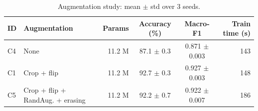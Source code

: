 \begin{table}[t]
\caption{Augmentation study: mean $\pm$ std over 3 seeds.}
\label{tab:augmentation}
\begin{tabular}{llrccr}
\toprule
ID & Augmentation & Params & Accuracy (\%) & Macro-F1 & Train time (s) \\
\midrule
C4 & None & 11.2 M & 87.1 $\pm$ 0.3 & 0.871 $\pm$ 0.003 & 143 \\
C1 & Crop + flip & 11.2 M & 92.7 $\pm$ 0.3 & 0.927 $\pm$ 0.003 & 148 \\
C5 & Crop + flip + RandAug. + erasing & 11.2 M & 92.2 $\pm$ 0.7 & 0.922 $\pm$ 0.007 & 186 \\
\bottomrule
\end{tabular}
\end{table}
